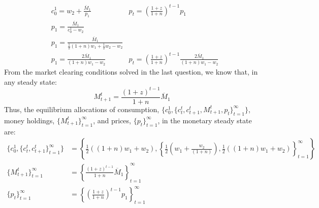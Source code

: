 \documentclass{article}
\begin{document}
\begin{enumerate}
		\begin{align*}
			&c_0^1 = w_2 + \frac{\overline{M}_1}{p_1}								& p_t = \left(\frac{1+z}{1+n}\right)^{t-1}p_1	   \\
			&p_1 = \frac{\overline{M}_1}{c_0^1-w_2}									& \\
			&p_1 = \frac{\overline{M}_1}{\frac{1}{2}(1+n)w_1 + \frac{1}{2}w_2-w_2}	& \\
			&p_1 = \frac{2\overline{M}_1}{(1+n)w_1-w_2}	&p_t = \left(\frac{1+z}{1+n}\right)^{t-1}\frac{2\overline{M}_1}{(1+n)w_1-w_2}
		\end{align*}
		From the  market clearing conditions solved in the last question, we know that, in any steady state:
		\[
			M_{t+1}^t = \frac{(1+z)^{t-1}}{1+n}\overline{M}_1
		\]
		Thus, the equilibrium allocations of consumption, $\{c_0^1,\{c_t^t,c^t_{t+1},M_{t+1}^t,p_t\}_{t=1}^\infty\}$, money holdings, $\{M_{t+1}^t\}_{t=1}^\infty$, and prices, $\{p_t\}_{t=1}^\infty$, in the monetary steady state are:
		\begin{align*}
			\{c_0^1,\{c_t^t,c^t_{t+1}\}_{t=1}^\infty\} &= \left\{\frac{1}{2}\left((1+n)w_1 + w_2\right), \left\{\frac{1}{2}\left(w_1 + \frac{w_2}{(1+n)}\right),\frac{1}{2}\left((1+n)w_1 + w_2\right) \right\}_{t=1}^\infty\right\} \\
			\{M_{t+1}^t\}_{t=1}^\infty &= \left\{\frac{(1+z)^{t-1}}{1+n}\overline{M}_1 \right\}_{t=1}^\infty \\
			\{p_t\}_{t=1}^\infty &= \left\{\left(\frac{1+z}{1+n}\right)^{t-1}p_1 \right\}_{t=1}^\infty
		\end{align*}
		

\end{enumerate}
\end{document}
